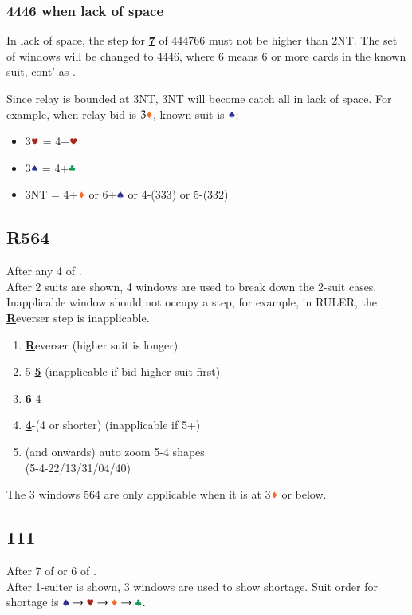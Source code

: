 \documentclass{article}
\begin{document}
\begin{multicols}{2}
\pagebreak

\subsubsection{4446 when lack of space}\label{sec:4446}
In lack of space, the step for \textbf{\underline{7}} of 444766 must not be higher than 2NT. The set of windows will be changed to 4446, where 6 means 6 or more cards in the known suit, cont' as .

\noindent Since relay is bounded at 3NT, 3NT will become catch all in lack of space. For example, when relay bid is $3\ddd$, known suit is $\sss$:
\begin{itemize}
    \item 3$\hhh$ = 4+$\hhh$
    \item 3$\sss$ = 4+$\ccc$
    \item 3NT = 4+$\ddd$ or 6+$\sss$ or 4-(333) or 5-(332)
\end{itemize}

\subsection{R564}\label{sec:R564}
After any 4 of . \\
After 2 suits are shown, 4 windows are used to break down the 2-suit cases. Inapplicable window should not occupy a step, for example, in RULER, the \textbf{\underline{R}}everser step is inapplicable.

\begin{enumerate}
    \item \textbf{\underline{R}}everser (higher suit is longer)
    \item 5-\textbf{\underline{5}} (inapplicable if bid higher suit first)
    \item \textbf{\underline{6}}-4
    \item \textbf{\underline{4}}-(4 or shorter) (inapplicable if 5+)
    \item (and onwards) auto zoom 5-4 shapes \\
        (5-4-22/13/31/04/40)
\end{enumerate}

\noindent The 3 windows 564 are only applicable when it is at 3$\ddd$ or below.

\subsection{111}\label{sec:111}
After 7 of  or 6 of . \\
After 1-suiter is shown, 3 windows are used to show shortage. Suit order for shortage is $\sss \rightarrow \hhh \rightarrow \ddd \rightarrow \ccc$.


\end{multicols}
\end{document}
